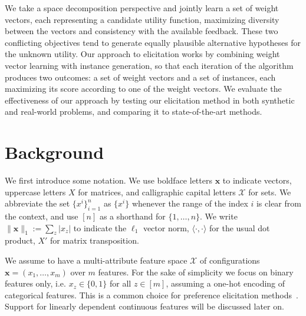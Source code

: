 \documentclass{article}
\renewcommand\[{\begin{equation}}
\renewcommand\]{\end{equation}}
\newcommand{\calvar}[1]{\ensuremath{\mathcal{#1}}}
\newcommand{\calX}{\calvar{X}}
\newcommand{\vecvar}[1]{\ensuremath{\boldsymbol{#1}}}
\newcommand{\vx}{\vecvar{x}}
\begin{document}
We take a space decomposition perspective and jointly learn a set of
weight vectors, each representing a candidate utility function,
maximizing diversity between the vectors and consistency with the
available feedback. These two conflicting objectives tend to generate
equally plausible alternative hypotheses for the unknown
utility. 
Our approach to elicitation works by combining weight vector
learning with instance generation, so that each iteration of the
algorithm produces two outcomes: a set of weight vectors and a set of
instances, each maximizing its score according to one of the weight
vectors. 
We evaluate the effectiveness of our approach by testing our
elicitation method in both synthetic and real-world problems, and
comparing it to state-of-the-art methods.




\section{Background}
\label{sec:background}

We first introduce some notation.
We use boldface letters $\vx$ to indicate vectors,
uppercase letters $X$ for matrices, and calligraphic capital letters $\calX$
for sets. We %
abbreviate the set $\{ x^i \}_{i=1}^n$ as $\{ x^i \}$
whenever the range of the index $i$ is clear from the context, and use $[n]$ as
a shorthand for %
$\{1, \ldots, n\}$. We write $\|\vx\|_1 := \sum_z |x_z|$
to indicate the $\ell_1$ vector norm, $\langle \cdot, \cdot \rangle$ for the usual dot product,  $X'$ for matrix transposition.

We assume to have a multi-attribute feature space
$\calX$ of configurations $\vx = (x_1, \ldots, x_m)$ over $m$
features. For the sake of simplicity we focus on binary features only,
i.e. $x_z\in\{0,1\}$ for all $z\in[m]$, assuming a one-hot encoding of
categorical features. This is a common choice for preference
elicitation methods~\cite{guo2010real,viappiani2010optimal}. Support
for linearly dependent continuous features will be discussed later on.
\end{document}
